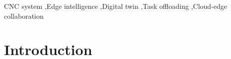 \documentclass[preprint,12pt]{elsarticle}
\begin{document}
\begin{frontmatter}
\begin{abstract}
\end{abstract}



\begin{keyword}
CNC system \sep Edge intelligence \sep Digital twin \sep Task offloading \sep Cloud-edge collaboration


\end{keyword}

\end{frontmatter}


\section{Introduction}
\end{document}
